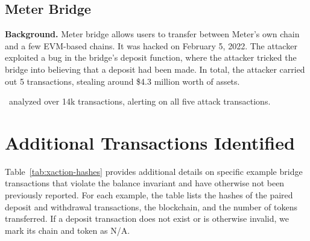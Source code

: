 \subsection{Meter Bridge}
\textbf{Background.} Meter bridge allows users to transfer between Meter's own chain and a few EVM-based chains. It was hacked on February 5, 2022. The attacker exploited a bug in the bridge's deposit function, where the attacker tricked the bridge into believing that a deposit had been made. In total, the attacker carried out 5 transactions, stealing around \$4.3 million worth of assets.

 \offlinetool~analyzed over 14k transactions, alerting on all five attack transactions.




\section{Additional Transactions Identified}

Table~\ref{tab:xaction-hashes} provides additional details on specific
example bridge transactions that violate the balance invariant and
have otherwise not been previously reported.  For each example, the
table lists the hashes of the paired deposit and withdrawal
transactions, the blockchain, and the number of tokens transferred. If
a deposit transaction does not exist or is otherwise invalid, we mark
its chain and token as N/A.
